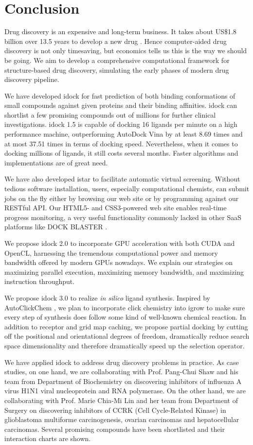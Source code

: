 \chapter{Conclusion}

Drug discovery is an expensive and long-term business. It takes about US\$1.8 billion over 13.5 years to develop a new drug \citep{716}. Hence computer-aided drug discovery is not only timesaving, but economics tells us this is the way we should be going. We aim to develop a comprehensive computational framework for structure-based drug discovery, simulating the early phases of modern drug discovery pipeline.

We have developed idock for fast prediction of both binding conformations of small compounds against given proteins and their binding affinities. idock can shortlist a few promising compounds out of millions for further clinical investigations. idock 1.5 is capable of docking 16 ligands per minute on a high performance machine, outperforming AutoDock Vina \citep{595} by at least 8.69 times and at most 37.51 times in terms of docking speed. Nevertheless, when it comes to docking millions of ligands, it still costs several months. Faster algorithms and implementations are of great need.

We have also developed istar to facilitate automatic virtual screening. Without tedious software installation, users, especially computational chemists, can submit jobs on the fly either by browsing our web site or by programming against our RESTful API. Our HTML5- and CSS3-powered web site enables real-time progress monitoring, a very useful functionality commonly lacked in other SaaS platforms like DOCK BLASTER \citep{557}.

We propose idock 2.0 to incorporate GPU acceleration with both CUDA and OpenCL, harnessing the tremendous computational power and memory bandwidth offered by modern GPUs nowadays. We explain our strategies on maximizing parallel execution, maximizing memory bandwidth, and maximizing instruction throughput.

We propose idock 3.0 to realize \textit{in silico} ligand synthesis. Inspired by AutoClickChem \citep{1051}, we plan to incorporate click chemistry into igrow to make sure every step of synthesis does follow some kind of well-known chemical reaction. In addition to receptor and grid map caching, we propose partial docking by cutting off the positional and orientational degrees of freedom, dramatically reduce search space dimensionality and therefore dramatically speed up the selection operator.

We have applied idock to address drug discovery problems in practice. As case studies, on one hand, we are collaborating with Prof. Pang-Chui Shaw and his team from Department of Biochemistry on discovering inhibitors of influenza A virus H1N1 viral nucleoprotein and RNA polymerase. On the other hand, we are collaborating with Prof. Marie Chia-Mi Lin and her team from Department of Surgery on discovering inhibitors of CCRK (Cell Cycle-Related Kinase) in glioblastoma multiforme carcinogenesis, ovarian carcinomas and hepatocellular carcinomas. Several promising compounds have been shortlisted and their interaction charts are shown.

\chapterend
